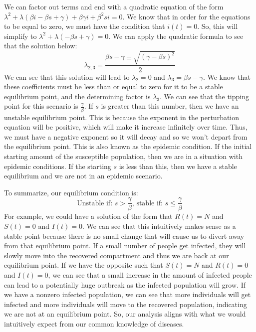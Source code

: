 \documentclass[12pt, a4paper]{article}
\begin{document}
        We can factor out terms and end with a quadratic equation of the form
        \newline $\lambda^2 + \lambda(\beta i - \beta s + \gamma) + \beta \gamma i  + \beta^2si = 0$. We know that in order for the equations to be equal to zero, we must have the condition that $i(t) = 0$. So, this will simplify to $\lambda^2 + \lambda(- \beta s + \gamma) = 0$. We can apply the quadratic formula to see that the solution below:
        \[
        \lambda_{2,3} = \frac{\beta s - \gamma \pm \sqrt{(\gamma - \beta s)^2}}{2} 
        \]   
        We can see that this solution will lead to $\lambda_2 = 0$ and $\lambda_3 = \beta s - \gamma$. We know that these coefficients must be less than or equal to zero for it to be a stable equilibrium point, and the determining factor is $\lambda_3$. We can see that the tipping point for this scenario is $\frac{\gamma}{\beta}$. If $s$ is greater than this number, then we have an unstable equilibrium point. This is because the exponent in the perturbation equation will be positive, which will make it increase infinitely over time. Thus, we must have a negative exponent so it will decay and so we won't depart from the equilibrium point. This is also known as the epidemic condition. If the initial starting amount of the susceptible population, then we are in a situation with epidemic conditions. If the starting $s$ is less than this, then we have a stable equilibrium and we are not in an epidemic scenario.
        
        To summarize, our equilibrium condition is: 
        \[
        \mbox{Unstable if: }s > \frac{\gamma}{\beta} \mbox{, stable if: }s \leq \frac{\gamma}{\beta}
        \]
        For example, we could have a solution of the form that $R(t)=N$ and $S(t)=0$ and $I(t)=0$. We can see that this intuitively makes sense as a stable point because there is no small change that will cause us to divert away from that equilibrium point. If a small number of people get infected, they will slowly move into the recovered compartment and thus we are back at our equilibrium point. If we have the opposite such that $S(t)=N$ and $R(t)=0$ and $I(t)=0$, we can see that a small increase in the amount of infected people can lead to a potentially huge outbreak as the infected population will grow. If we have a nonzero infected population, we can see that more individuals will get infected and more individuals will move to the recovered population, indicating we are not at an equilibrium point. So, our analysis aligns with what we would intuitively expect from our common knowledge of diseases.
        
\end{document}
